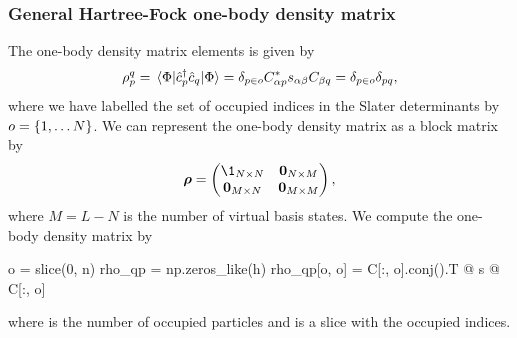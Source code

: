             \subsubsection{General Hartree-Fock one-body density matrix}
                The one-body density matrix elements is given by
                \begin{align}
                    \rho^{q}_{p}
                    = \mel*{\Phi}{
                        \hat{c}_{p}^{\dagger}
                        \hat{c}_{q}
                    }{\Phi}
                    = \delta_{p \in o}
                    C^{*}_{\alpha p} s_{\alpha\beta}
                    C_{\beta q}
                    = \delta_{p \in o}
                    \delta_{pq},
                \end{align}
                where we have labelled the set of occupied indices in the Slater
                determinants by $o = \left\{ 1, \dots N \right\}$.
                We can represent the one-body density matrix as a block matrix
                by
                \begin{align}
                    \vfg{\densityten}
                    = \begin{pmatrix}
                        \1_{N \times N} & \vfg{0}_{N \times M} \\
                        \vfg{0}_{M \times N} & \vfg{0}_{M \times M}
                    \end{pmatrix},
                \end{align}
                where $M = L - N$ is the number of virtual basis states.
                We compute the one-body density matrix by
                \begin{python}
o = slice(0, n)
rho_qp = np.zeros_like(h)
rho_qp[o, o] = C[:, o].conj().T @ s @ C[:, o]
                \end{python}
                where  is the number of occupied particles and 
                is a slice with the occupied indices.


